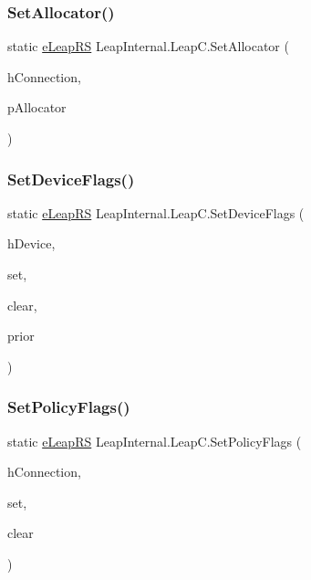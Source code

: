 \subsubsection{\texorpdfstring{SetAllocator()}{SetAllocator()}}
{\footnotesize\ttfamily static \mbox{\hyperlink{namespace_leap_internal_ae50b07d24c508b84273392b6dcbea1d9}{e\+Leap\+RS}} Leap\+Internal.\+Leap\+C.\+Set\+Allocator (\begin{DoxyParamCaption}\item[{Int\+Ptr}]{h\+Connection,  }\item[{ref \mbox{\hyperlink{struct_leap_internal_1_1_l_e_a_p___a_l_l_o_c_a_t_o_r}{L\+E\+A\+P\+\_\+\+A\+L\+L\+O\+C\+A\+T\+OR}}}]{p\+Allocator }\end{DoxyParamCaption})}

\mbox{\label{class_leap_internal_1_1_leap_c_a903a82df9979ed709e4d6a05f6a2c1fc}} 
\subsubsection{\texorpdfstring{SetDeviceFlags()}{SetDeviceFlags()}}
{\footnotesize\ttfamily static \mbox{\hyperlink{namespace_leap_internal_ae50b07d24c508b84273392b6dcbea1d9}{e\+Leap\+RS}} Leap\+Internal.\+Leap\+C.\+Set\+Device\+Flags (\begin{DoxyParamCaption}\item[{Int\+Ptr}]{h\+Device,  }\item[{U\+Int64}]{set,  }\item[{U\+Int64}]{clear,  }\item[{out U\+Int64}]{prior }\end{DoxyParamCaption})}

\mbox{\label{class_leap_internal_1_1_leap_c_aeba99ff7b5740de9709a1535ca6d8ae4}} 
\subsubsection{\texorpdfstring{SetPolicyFlags()}{SetPolicyFlags()}}
{\footnotesize\ttfamily static \mbox{\hyperlink{namespace_leap_internal_ae50b07d24c508b84273392b6dcbea1d9}{e\+Leap\+RS}} Leap\+Internal.\+Leap\+C.\+Set\+Policy\+Flags (\begin{DoxyParamCaption}\item[{Int\+Ptr}]{h\+Connection,  }\item[{U\+Int64}]{set,  }\item[{U\+Int64}]{clear }\end{DoxyParamCaption})}

